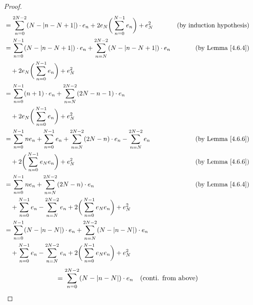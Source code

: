 \begin{proof}
\begin{align*}
         & = \sum_{n = 0}^{2N - 2} (N - \abs*{n - N + 1}) \cdot e_n + 2 e_N \bigg(\sum_{n = 0}^{N - 1} e_n\bigg) + e_N^2                  & \text{(by induction hypothesis)} \\
         & = \sum_{n = 0}^{N - 1} (N - \abs*{n - N + 1}) \cdot e_n + \sum_{n = N}^{2N - 2} (N - \abs*{n - N + 1}) \cdot e_n               & \text{(by Lemma \ref{4.6.4})}    \\
         & \quad + 2 e_N \bigg(\sum_{n = 0}^{N - 1} e_n\bigg) + e_N^2                                                                                                        \\
         & = \sum_{n = 0}^{N - 1} (n + 1) \cdot e_n + \sum_{n = N}^{2N - 2} (2N - n - 1) \cdot e_n                                                                           \\
         & \quad + 2 e_N \bigg(\sum_{n = 0}^{N - 1} e_n\bigg) + e_N^2                                                                                                        \\
         & = \sum_{n = 0}^{N - 1} n e_n + \sum_{n = 0}^{N - 1} e_n + \sum_{n = N}^{2N - 2} (2N - n) \cdot e_n - \sum_{n = N}^{2N - 2} e_n & \text{(by Lemma \ref{4.6.6})}    \\
         & \quad + 2 \bigg(\sum_{n = 0}^{N - 1} e_N e_n\bigg) + e_N^2                                                                     & \text{(by Lemma \ref{4.6.6})}    \\
         & = \sum_{n = 0}^{N - 1} n e_n + \sum_{n = N}^{2N - 2} (2N - n) \cdot e_n                                                        & \text{(by Lemma \ref{4.6.4})}    \\
         & \quad + \sum_{n = 0}^{N - 1} e_n - \sum_{n = N}^{2N - 2} e_n + 2 \bigg(\sum_{n = 0}^{N - 1} e_N e_n\bigg) + e_N^2                                                 \\
         & = \sum_{n = 0}^{N - 1} (N - \abs*{n - N}) \cdot e_n + \sum_{n = N}^{2N - 2} (N - \abs*{n - N}) \cdot e_n                                                          \\
         & \quad + \sum_{n = 0}^{N - 1} e_n - \sum_{n = N}^{2N - 2} e_n + 2 \bigg(\sum_{n = 0}^{N - 1} e_N e_n\bigg) + e_N^2
    \end{align*}
    \begin{align*}
         & = \sum_{n = 0}^{2N - 2} (N - \abs*{n - N}) \cdot e_n                                                              & \text{(conti. from above)}           \\

\end{align*}
\end{proof}
